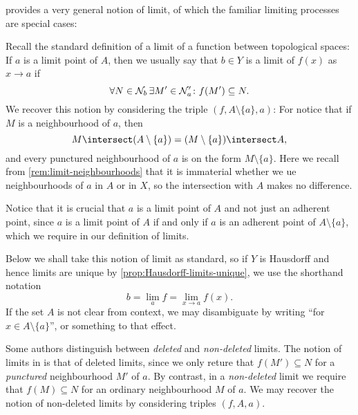 \documentclass[article, a4paper, 11pt, oneside]{memoir}
\numberwithin{equation}{chapter}
\begin{document}
\begin{example}
     provides a very general notion of limit, of which the familiar limiting processes are special cases:
    \begin{enumexample}
        \item \label{enum:deleted-limit} Recall the standard definition of a limit of a function between topological spaces: If $a$ is a limit point of $A$, then we usually say that $b \in Y$ is a limit of $f(x)$ as $x \to a$ if
        \begin{equation*}
            \forall N \in \mathcal{N}_{b}\,
                \exists M' \in \mathcal{N}'_{a} \colon
                f(M') \subseteq N.
        \end{equation*}
        We recover this notion by considering the triple $(f,A \setminus \{a\},a)$: For notice that if $M$ is a neighbourhood of $a$, then
        \begin{equation*}
            M \intersect (A \setminus \{a\})
                = (M \setminus \{a\}) \intersect A,
        \end{equation*}
        and every punctured neighbourhood of $a$ is on the form $M \setminus \{a\}$. Here we recall from \cref{rem:limit-neighbourhoods} that it is immaterial whether we ue neighbourhoods of $a$ in $A$ or in $X$, so the intersection with $A$ makes no difference.

        Notice that it is crucial that $a$ is a limit point of $A$ and not just an adherent point, since $a$ is a limit point of $A$ if and only if $a$ is an adherent point of $A \setminus \{a\}$, which we require in our definition of limits.

        Below we shall take this notion of limit as standard, so if $Y$ is Hausdorff and hence limits are unique by \cref{prop:Hausdorff-limits-unique}, we use the shorthand notation
        \begin{equation*}
            b
                = \lim_a f
                = \lim_{x \to a} f(x).
        \end{equation*}
        If the set $A$ is not clear from context, we may disambiguate by writing \enquote{for $x \in A \setminus \{a\}$},  or something to that effect.

        \item Some authors distinguish between \emph{deleted} and \emph{non-deleted} limits. The notion of limits in  is that of deleted limits, since we only reture that $f(M') \subseteq N$ for a \emph{punctured} neighbourhood $M'$ of $a$. By contrast, in a \emph{non-deleted} limit we require that $f(M) \subseteq N$ for an ordinary neighbourhood $M$ of $a$. We may recover the notion of non-deleted limits by considering triples $(f,A,a)$.
        

\end{enumexample}
\end{example}
\end{document}
